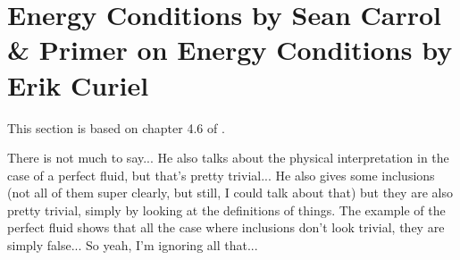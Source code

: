 \documentclass[a4paper,11pt]{article}
\numberwithin{equation}{section}
\theoremstyle{definition}
\newtheorem{comment}{Comment}
\begin{document}

\section{Energy Conditions by Sean Carrol \& Primer on Energy Conditions by Erik Curiel}
This section is based on chapter 4.6 of \cite{E_Cond}.

\color{red} There is not much to say... He also talks about the physical interpretation in the case of a perfect fluid, but that's pretty trivial... He also gives some inclusions (not all of them super clearly, but still, I could talk about that) but they are also pretty trivial, simply by looking at the definitions of things. The example of the perfect fluid shows that all the case where inclusions don't look trivial, they are simply false... So yeah, I'm ignoring all that...\color{black}
\end{document}

